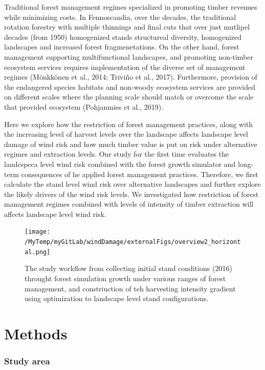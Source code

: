 \documentclass[]{elsarticle} %
\begin{document}
Traditional forest management regimes specialized in promoting timber
revenues while minimizing costs. In Fennoscandia, over the decades, the
traditional rotation forestry with multiple thinnings and final cuts
that over just mutlipel decades (from 1950) homogenized stands
structureal diversity, homogenized landscapes and increased forest
fragmenetations. On the other hand, forest management supporting
multifunctional landscapes, and promoting non-timber ecosystem services
requires implementation of the diverse set of management regimes
(Mönkkönen et al., 2014; Triviño et al., 2017). Furthermore, provision
of the endangered species habitats and non-woody ecosystem services are
provided on different scales where the planning scale should match or
overcome the scale that provided ecosystem (Pohjanmies et al., 2019).

Here we explore how the restriction of forest management practices,
along with the increasing level of harvest levels over the landscape
affects landscape level damage of wind risk and how much timber value is
put on risk under alternative regimes and extraction levels. Our study
for the first time evaluates the landcspeca level wind risk combined
with the forest growth simulator and long-term consequences of he
applied forest management practices. Therefore, we first calculate the
stand level wind risk over alternative landscapes and further explore
the likely drivers of the wind risk levels. We investigated how
restriction of forest management regimes combined with levels of
intensity of timber extraction will affects landscape level wind risk.

\begin{figure}
\centering
\texttt{[image: /MyTemp/myGitLab/windDamage/externalFigs/overview2\_horizontal.png]}
\caption{The study workflow from collecting initial stand conditions
(2016) throught forest simulation growth under various ranges of forest
management, and constriuction of teh harvesting intensity gradient using
optimization to landscape level stand configurations.}
\end{figure}

\section{Methods}\label{methods}

\subsubsection{Study area}\label{study-area}
\end{document}
